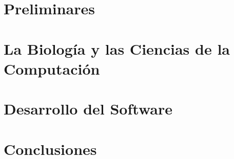 \documentclass[a4paper,10pt]{report}
\theoremstyle{definition}
\begin{document}






\tableofcontents

\part{Preliminares}


\part{La Biolog\'ia y las Ciencias de la Computaci\'on}




\part{Desarrollo del Software}
\label{software}






\part{Conclusiones}


\cleardoublepage



\appendix

\end{document}
